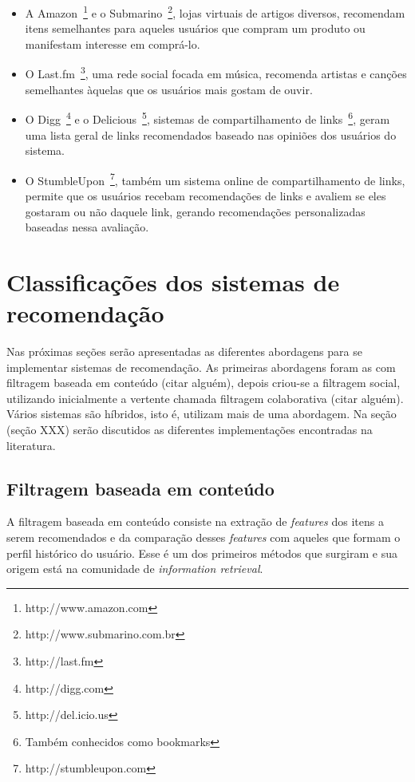 \begin{itemize}
\item 
A Amazon~\footnote{http://www.amazon.com} e o Submarino~\footnote{http://www.submarino.com.br}, lojas virtuais de artigos diversos, recomendam itens semelhantes para aqueles usuários que compram um produto ou manifestam interesse em comprá-lo.

\item O Last.fm~\footnote{http://last.fm}, uma rede social focada em música, recomenda artistas e canções semelhantes àquelas que os usuários mais gostam de ouvir.

\item O Digg~\footnote{http://digg.com} e o Delicious~\footnote{http://del.icio.us}, sistemas de compartilhamento de links~\footnote{Também conhecidos como bookmarks}, geram uma lista geral de links recomendados baseado nas opiniões dos usuários do sistema.

\item O StumbleUpon~\footnote{http://stumbleupon.com}, também um sistema online de compartilhamento de links, permite que os usuários recebam recomendações de links e avaliem se eles gostaram ou não daquele link, gerando recomendações personalizadas baseadas nessa avaliação.
\end{itemize}


\section{Classificações dos sistemas de recomendação}

Nas próximas seções serão apresentadas as diferentes abordagens para se implementar sistemas de recomendação. As primeiras abordagens foram as com filtragem baseada em conteúdo (citar alguém), depois criou-se a filtragem social, utilizando inicialmente a vertente chamada filtragem colaborativa (citar alguém). Vários sistemas são híbridos, isto é, utilizam mais de uma abordagem. Na seção (seção XXX) serão discutidos as diferentes implementações encontradas na literatura.

\subsection{Filtragem baseada em conteúdo} %
A filtragem baseada em conteúdo consiste na extração de \textit{features} dos itens a serem recomendados e da comparação desses \textit{features} com aqueles que formam o  perfil histórico do usuário. Esse é um dos primeiros métodos que surgiram e sua origem está na comunidade de \textit{information retrieval}.~\cite{Balabanovi97}

